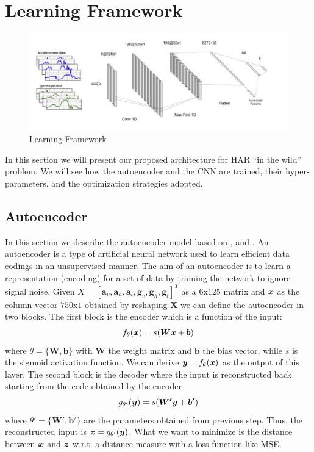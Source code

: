 \section{Learning Framework}
\label{sec:learning-framework}

\begin{figure}[h]
	\centering
	\includegraphics[width=1\textwidth]{images/full_architecture.jpg}
	\caption{Learning Framework}
	\label{fig:proposed-architecture}
\end{figure}

In this section we will present our proposed architecture for HAR ``in
the wild'' problem. We will see how the autoencoder and the CNN are
trained, their hyper-parameters, and the optimization strategies adopted.

\subsection{Autoencoder}
\label{subsec:autoencoder}

In this section we describe the autoencoder model based on
\cite{vincent2010stacked}, \cite{gu2018locomotion} and
\cite{gao2019human}. An autoencoder is a type of artificial neural
network used to learn efficient data codings in an unsupervised
manner. The aim of an autoencoder is to learn a representation
(encoding) for a set of data by training the network to ignore signal
noise. Given $X = [ \boldsymbol{a}_v, \boldsymbol{a}_h,
  \boldsymbol{a}_l, \boldsymbol{g}_v, \boldsymbol{g}_h,
  \boldsymbol{g}_l ]^T$ as a $6\text{x}125$ matrix and $\boldsymbol{x}$ as the
column vector $750\text{x}1$ obtained by reshaping $\boldsymbol{X}$ we
can define the autoencoder in two blocks. The first block is the
encoder which is a function of the input:
\begin{equation}
  f_\theta(\boldsymbol{x}) = s(\boldsymbol{W}\boldsymbol{x} + \boldsymbol{b})
\end{equation}
where $\theta = \{ \boldsymbol{W}, \boldsymbol{b} \}$ with
$\boldsymbol{W}$ the weight matrix and $\boldsymbol{b}$ the bias
vector, while $s$ is the sigmoid activation function. We
can derive $\boldsymbol{y} = f_\theta(\boldsymbol{x})$ as the output of this
layer. The second block is the decoder where the input is
reconstructed back starting from the code obtained by the encoder
\begin{equation}
  g_{\theta'}(\boldsymbol{y}) = s(\boldsymbol{W'}\boldsymbol{y} + \boldsymbol{b'})
\end{equation}
where $\theta' = \{ \boldsymbol{W'}, \boldsymbol{b'} \}$ are the
parameters obtained from previous step. Thus, the reconstructed input
is $\boldsymbol{z} = g_{\theta'}(\boldsymbol{y})$. What we want to minimize is the distance
between $\boldsymbol{x}$ and $\boldsymbol{z}$ w.r.t. a distance measure with a loss function
like MSE.

